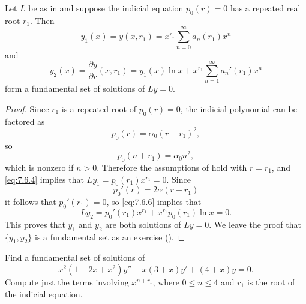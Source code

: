 \begin{theorem}\label{thmtype:7.6.2}
Let $L$ be as in  and suppose the
indicial equation $p_0(r)=0$ has a repeated real root $r_1$.
Then
\[
y_1(x)=y(x,r_1)=x^{r_1}\sum_{n=0}^\infty a_n(r_1)x^n
\]
and
\begin{equation} \label{eq:7.6.8}
y_2(x)=\frac{\partial y}{\partial r}(x,r_1)=y_1(x)\ln
x+x^{r_1}\sum_{n=1}^\infty a_n'(r_1)x^n
\end{equation}
form a fundamental set of solutions of $Ly=0$.
\end{theorem}

\begin{proof}
Since $r_1$  is a repeated root of $p_0(r)=0$, the indicial polynomial
can be factored as
\[
p_0(r)=\alpha_0(r-r_1)^2,
\]
so
\[
p_0(n+r_1)=\alpha_0n^2,
\]
which is nonzero if $n>0$. Therefore the assumptions of
 hold with $r=r_1$, and \eqref{eq:7.6.4} implies
that $Ly_1=p_0(r_1)x^{r_1}=0$. Since
\[
p_0'(r)=2\alpha(r-r_1)
\]
it follows that $p_0'(r_1)=0$, so \eqref{eq:7.6.6} implies that
\[
Ly_2=p_0'(r_1)x^{r_1}+x^{r_1}p_0(r_1)\ln x=0.
\]
This proves that $y_1$ and $y_2$ are both solutions of $Ly=0$. We
leave the proof that $\{y_1,y_2\}$ is a fundamental set as an exercise
().
\end{proof}

\begin{example}\label{example:7.6.1}
Find  a fundamental set of solutions of
\begin{equation} \label{eq:7.6.9}
x^2(1-2x+x^2)y''-x(3+x)y'+(4+x)y=0.
\end{equation}
Compute just the terms involving $x^{n+r_1}$, where  $0\le n\le4$
and $r_1$ is the root of the indicial equation.
\end{example}


